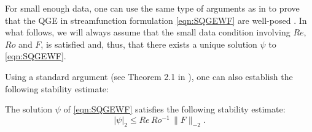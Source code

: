 For small enough data, one can use the same type of arguments as in
\cite{Girault79,Girault86} to prove that the QGE in streamfunction formulation
\eqref{eqn:SQGEWF} are well-posed \cite{Barcilon,Ipatova10,Wolansky88}.  In what
follows, we will always assume that the small data condition involving $Re$,
$Ro$ and $F$, is satisfied and, thus, that there exists a unique solution $\psi$
to \eqref{eqn:SQGEWF}.

Using a standard argument (see Theorem 2.1 in \cite{Cayco86}), one can also
establish the following stability estimate:
\begin{thm} \label{thm:stability_sqge}
  The solution $\psi$ of \eqref{eqn:SQGEWF} satisfies the following stability
  estimate:
  \begin{equation}
   |\psi|_2
   \le Re \, Ro^{-1} \, \| F \|_{-2} .
   \label{eqn:stability_sqge}
  \end{equation}
\end{thm}
